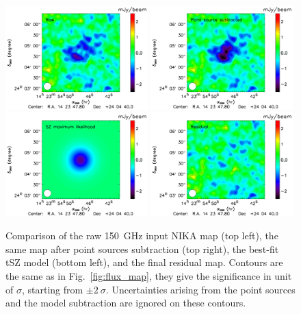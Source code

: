 \documentclass[twocolumn,traditabstract]{aa}
\begin{document}
\begin{figure}[h]
\centering
\includegraphics[width=0.49\textwidth]{Figure/MCMC_raw_map.pdf}
\includegraphics[width=0.49\textwidth]{Figure/MCMC_point_source_removed.pdf}
\includegraphics[width=0.49\textwidth]{Figure/MCMC_best_fit.pdf}
\includegraphics[width=0.49\textwidth]{Figure/MCMC_residual.pdf}
\caption{Comparison of the raw 150~GHz input NIKA map (top left), the same map after point sources subtraction (top right), the best-fit tSZ model (bottom left), and the final residual map. Contours are the same as in Fig.~\ref{fig:flux_map}, they give the significance in unit of $\sigma$, starting from $\pm 2 \ \sigma$. Uncertainties arising from the point sources and the model subtraction are ignored on these contours.}
\label{fig:MACSJ1424_MCMC_modeling}
\end{figure}
\end{document}
